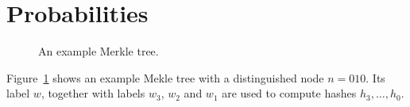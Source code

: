 \documentclass[a4paper]{article}
\begin{document}
%
%
%
%
%
%
%
%
%

\section{Probabilities}

\begin{figure}
  
  \caption{An example Merkle tree.}
  \label{fig:merkle}
\end{figure}

Figure~\ref{fig:merkle} shows an example Mekle tree with a distinguished node $n = 010$. Its label $w$, together with labels $w_3$, $w_2$ and $w_1$ are used to compute hashes $h_3, \ldots, h_0$.
\end{document}
